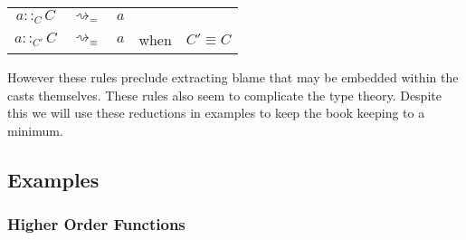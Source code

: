 \begin{tabular}{ccccc}
$a::_{C}C$ & $\rightsquigarrow_{=}$ & $a$ &  & \tabularnewline
$a::_{C'}C$ & $\rightsquigarrow_{\equiv}$ & $a$ & when & $C'\equiv C$\tabularnewline
\end{tabular}

However these rules preclude extracting blame that may be embedded
within the casts themselves. These rules also seem to complicate the
type theory. Despite this we will use these reductions in examples
to keep the book keeping to a minimum.

\subsection{Examples }


\subsubsection{Higher Order Functions}

